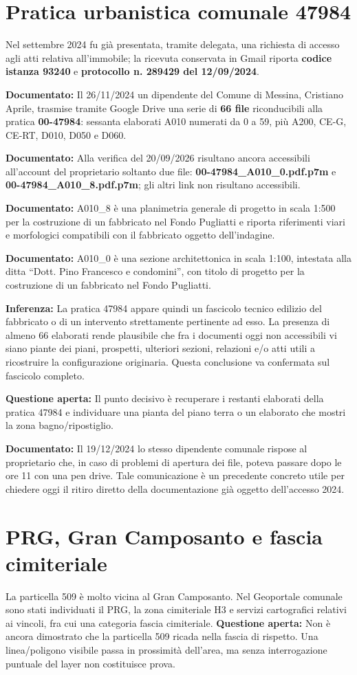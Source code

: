 \documentclass[11pt,a4paper]{article}
\newcommand{\docu}[1]{\textbf{\color{ok}Documentato:} #1}
\newcommand{\infer}[1]{\textbf{\color{warn}Inferenza:} #1}
\newcommand{\openq}[1]{\textbf{\color{warn}Questione aperta:} #1}
\begin{document}
\section{Pratica urbanistica comunale 47984}
Nel settembre 2024 fu già presentata, tramite delegata, una richiesta di accesso agli atti relativa all'immobile; la ricevuta conservata in Gmail riporta \textbf{codice istanza 93240} e \textbf{protocollo n. 289429 del 12/09/2024}.

\docu{Il 26/11/2024 un dipendente del Comune di Messina, Cristiano Aprile, trasmise tramite Google Drive una serie di \textbf{66 file} riconducibili alla pratica \textbf{00-47984}: sessanta elaborati A010 numerati da 0 a 59, più A200, CE-G, CE-RT, D010, D050 e D060.}

\docu{Alla verifica del 20/09/2026 risultano ancora accessibili all'account del proprietario soltanto due file: \textbf{00-47984\_A010\_0.pdf.p7m} e \textbf{00-47984\_A010\_8.pdf.p7m}; gli altri link non risultano accessibili.}

\docu{A010\_8 è una planimetria generale di progetto in scala 1:500 per la costruzione di un fabbricato nel Fondo Pugliatti e riporta riferimenti viari e morfologici compatibili con il fabbricato oggetto dell'indagine.}

\docu{A010\_0 è una sezione architettonica in scala 1:100, intestata alla ditta ``Dott. Pino Francesco e condomini'', con titolo di progetto per la costruzione di un fabbricato nel Fondo Pugliatti.}

\infer{La pratica 47984 appare quindi un fascicolo tecnico edilizio del fabbricato o di un intervento strettamente pertinente ad esso. La presenza di almeno 66 elaborati rende plausibile che fra i documenti oggi non accessibili vi siano piante dei piani, prospetti, ulteriori sezioni, relazioni e/o atti utili a ricostruire la configurazione originaria. Questa conclusione va confermata sul fascicolo completo.}

\openq{Il punto decisivo è recuperare i restanti elaborati della pratica 47984 e individuare una pianta del piano terra o un elaborato che mostri la zona bagno/ripostiglio.}

\docu{Il 19/12/2024 lo stesso dipendente comunale rispose al proprietario che, in caso di problemi di apertura dei file, poteva passare dopo le ore 11 con una pen drive. Tale comunicazione è un precedente concreto utile per chiedere oggi il ritiro diretto della documentazione già oggetto dell'accesso 2024.}

\section{PRG, Gran Camposanto e fascia cimiteriale}
La particella 509 è molto vicina al Gran Camposanto. Nel Geoportale comunale sono stati individuati il PRG, la zona cimiteriale H3 e servizi cartografici relativi ai vincoli, fra cui una categoria fascia cimiteriale.
\openq{Non è ancora dimostrato che la particella 509 ricada nella fascia di rispetto. Una linea/poligono visibile passa in prossimità dell'area, ma senza interrogazione puntuale del layer non costituisce prova.}
\end{document}
